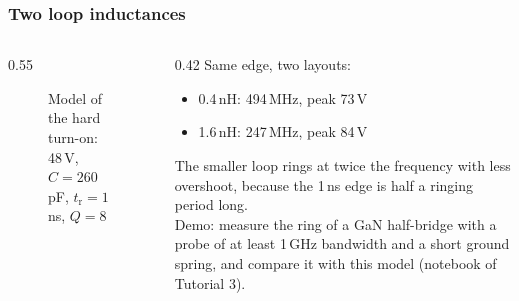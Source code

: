 \begin{frame}
	\frametitle{Two loop inductances}
	\begin{columns}[T]
		\begin{column}{0.55\textwidth}
			\begin{figure}
				\centering
				\caption{Model of the hard turn-on: 48\,V, $C=260$\,pF, $t_\mathrm{r}=1$\,ns, $Q=8$}
			\end{figure}
		\end{column}
		\begin{column}{0.42\textwidth}
			\small
			Same edge, two layouts:
			\begin{itemize}
				\item 0.4\,nH: 494\,MHz, peak 73\,V
				\item 1.6\,nH: 247\,MHz, peak 84\,V
			\end{itemize}
			The smaller loop rings at twice the frequency with less overshoot, because the 1\,ns edge is half a ringing period long.\\[0.4em]
			Demo: measure the ring of a GaN half-bridge with a probe of at least 1\,GHz bandwidth and a short ground spring, and compare it with this model (notebook of Tutorial 3).
		\end{column}
	\end{columns}
\end{frame}

